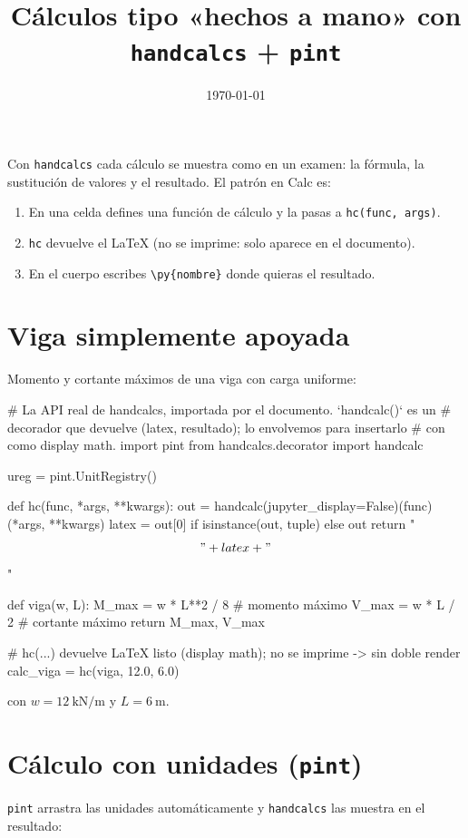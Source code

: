 \documentclass[11pt]{article}
\title{Cálculos tipo «hechos a mano» con \texttt{handcalcs} + \texttt{pint}}
\author{}
\date{\today}
\begin{document}
\maketitle

Con \texttt{handcalcs} cada cálculo se muestra como en un examen: la fórmula, la
sustitución de valores y el resultado. El patrón en Calc es:

\begin{enumerate}
  \item En una celda defines una función de cálculo y la pasas a \verb|hc(func, args)|.
  \item \verb|hc| devuelve el LaTeX (no se imprime: solo aparece en el documento).
  \item En el cuerpo escribes \verb|\py{nombre}| donde quieras el resultado.
\end{enumerate}

\section{Viga simplemente apoyada}
Momento y cortante máximos de una viga con carga uniforme:

# La API real de handcalcs, importada por el documento. `handcalc()` es un
# decorador que devuelve (latex, resultado); lo envolvemos para insertarlo
# con \py{} como display math.
import pint
from handcalcs.decorator import handcalc

ureg = pint.UnitRegistry()

def hc(func, *args, **kwargs):
    out = handcalc(jupyter_display=False)(func)(*args, **kwargs)
    latex = out[0] if isinstance(out, tuple) else out
    return "\[" + latex + "\]"

def viga(w, L):
    M_max = w * L**2 / 8      # momento máximo
    V_max = w * L / 2         # cortante máximo
    return M_max, V_max

# hc(...) devuelve LaTeX listo (display math); no se imprime -> sin doble render
calc_viga = hc(viga, 12.0, 6.0)


con $w = 12\ \mathrm{kN/m}$ y $L = 6\ \mathrm{m}$.

\section{Cálculo con unidades (\texttt{pint})}
\texttt{pint} arrastra las unidades automáticamente y \texttt{handcalcs} las
muestra en el resultado:
\end{document}
